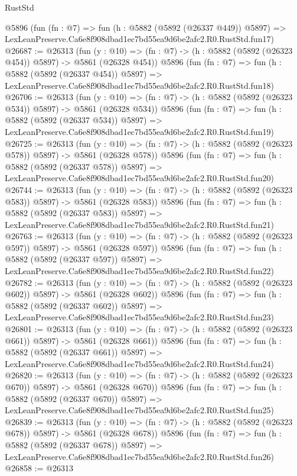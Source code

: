 \begin{lexlean}{RustStd}
\begin{coremodule}
    @5896
    (fun (fn : @7) =>
    fun (h : @5882 (@5892 (@26337 @449)) @5897) =>
    LexLeanPreserve.Ca6e8f908dbad1ec7bd55ea9d6be2afc2.R0.RustStd.fun17)
@26687 := @26313
    (fun (y : @10) => (fn : @7) -> (h : @5882 (@5892 (@26323 @454)) @5897) -> @5861 (@26328 @454))
    @5896
    (fun (fn : @7) =>
    fun (h : @5882 (@5892 (@26337 @454)) @5897) =>
    LexLeanPreserve.Ca6e8f908dbad1ec7bd55ea9d6be2afc2.R0.RustStd.fun18)
@26706 := @26313
    (fun (y : @10) => (fn : @7) -> (h : @5882 (@5892 (@26323 @534)) @5897) -> @5861 (@26328 @534))
    @5896
    (fun (fn : @7) =>
    fun (h : @5882 (@5892 (@26337 @534)) @5897) =>
    LexLeanPreserve.Ca6e8f908dbad1ec7bd55ea9d6be2afc2.R0.RustStd.fun19)
@26725 := @26313
    (fun (y : @10) => (fn : @7) -> (h : @5882 (@5892 (@26323 @578)) @5897) -> @5861 (@26328 @578))
    @5896
    (fun (fn : @7) =>
    fun (h : @5882 (@5892 (@26337 @578)) @5897) =>
    LexLeanPreserve.Ca6e8f908dbad1ec7bd55ea9d6be2afc2.R0.RustStd.fun20)
@26744 := @26313
    (fun (y : @10) => (fn : @7) -> (h : @5882 (@5892 (@26323 @583)) @5897) -> @5861 (@26328 @583))
    @5896
    (fun (fn : @7) =>
    fun (h : @5882 (@5892 (@26337 @583)) @5897) =>
    LexLeanPreserve.Ca6e8f908dbad1ec7bd55ea9d6be2afc2.R0.RustStd.fun21)
@26763 := @26313
    (fun (y : @10) => (fn : @7) -> (h : @5882 (@5892 (@26323 @597)) @5897) -> @5861 (@26328 @597))
    @5896
    (fun (fn : @7) =>
    fun (h : @5882 (@5892 (@26337 @597)) @5897) =>
    LexLeanPreserve.Ca6e8f908dbad1ec7bd55ea9d6be2afc2.R0.RustStd.fun22)
@26782 := @26313
    (fun (y : @10) => (fn : @7) -> (h : @5882 (@5892 (@26323 @602)) @5897) -> @5861 (@26328 @602))
    @5896
    (fun (fn : @7) =>
    fun (h : @5882 (@5892 (@26337 @602)) @5897) =>
    LexLeanPreserve.Ca6e8f908dbad1ec7bd55ea9d6be2afc2.R0.RustStd.fun23)
@26801 := @26313
    (fun (y : @10) => (fn : @7) -> (h : @5882 (@5892 (@26323 @661)) @5897) -> @5861 (@26328 @661))
    @5896
    (fun (fn : @7) =>
    fun (h : @5882 (@5892 (@26337 @661)) @5897) =>
    LexLeanPreserve.Ca6e8f908dbad1ec7bd55ea9d6be2afc2.R0.RustStd.fun24)
@26820 := @26313
    (fun (y : @10) => (fn : @7) -> (h : @5882 (@5892 (@26323 @670)) @5897) -> @5861 (@26328 @670))
    @5896
    (fun (fn : @7) =>
    fun (h : @5882 (@5892 (@26337 @670)) @5897) =>
    LexLeanPreserve.Ca6e8f908dbad1ec7bd55ea9d6be2afc2.R0.RustStd.fun25)
@26839 := @26313
    (fun (y : @10) => (fn : @7) -> (h : @5882 (@5892 (@26323 @678)) @5897) -> @5861 (@26328 @678))
    @5896
    (fun (fn : @7) =>
    fun (h : @5882 (@5892 (@26337 @678)) @5897) =>
    LexLeanPreserve.Ca6e8f908dbad1ec7bd55ea9d6be2afc2.R0.RustStd.fun26)
@26858 := @26313

\end{coremodule}
\end{lexlean}
